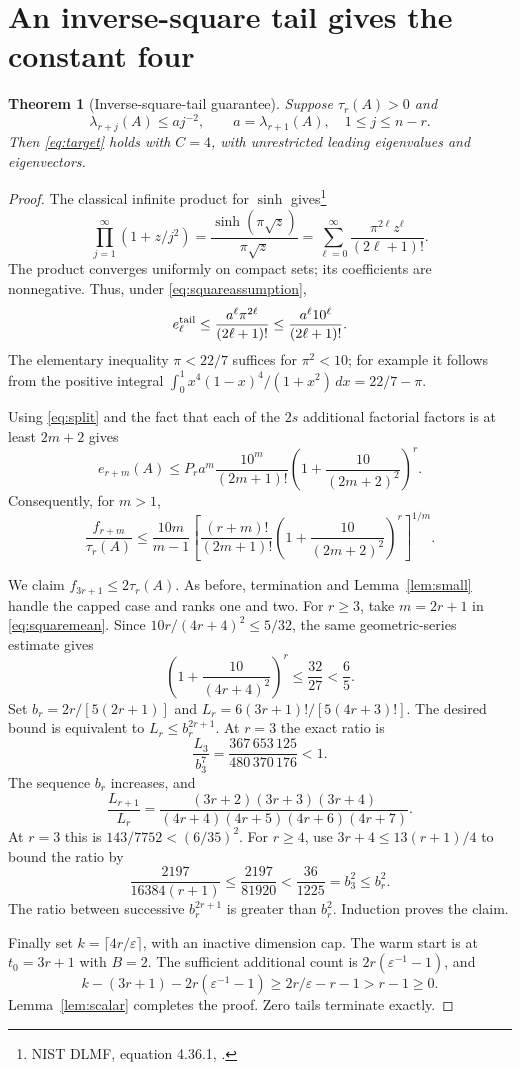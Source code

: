 \documentclass[11pt]{article}
\newtheorem{theorem}{Theorem}[section]
\theoremstyle{remark}\newtheorem{remark}[theorem]{Remark}
\newcommand{\eps}{\varepsilon}
\begin{document}
\section{An inverse-square tail gives the constant four}
\begin{theorem}[Inverse-square-tail guarantee]\label{thm:square}
Suppose $\tau_r(A)>0$ and
\begin{equation}
 \lambda_{r+j}(A)\le a j^{-2},\qquad
 a=\lambda_{r+1}(A),\quad1\le j\le n-r. \label{eq:squareassumption}
\end{equation}
Then \eqref{eq:target} holds with $C=4$, with unrestricted leading eigenvalues and eigenvectors.
\end{theorem}
\begin{proof}
The classical infinite product for $\sinh$ gives\footnote{NIST DLMF, equation 4.36.1, \cite{dlmf}.}
\[
 \prod_{j=1}^\infty(1+z/j^2)
 =\frac{\sinh(\pi\sqrt z)}{\pi\sqrt z}
 =\sum_{\ell=0}^\infty\frac{\pi^{2\ell}z^\ell}{(2\ell+1)!}.
\]
The product converges uniformly on compact sets; its coefficients are nonnegative. Thus, under \eqref{eq:squareassumption},
\[
 e_\ell^{\rm tail}\le\frac{a^\ell\pi^{2\ell}}{(2\ell+1)!}
 \le\frac{a^\ell10^\ell}{(2\ell+1)!}.
\]
The elementary inequality $\pi<22/7$ suffices for $\pi^2<10$; for example it follows from the positive integral
$\int_0^1 x^4(1-x)^4/(1+x^2)\,dx=22/7-\pi$.

Using \eqref{eq:split} and the fact that each of the $2s$ additional factorial factors is at least $2m+2$ gives
\[
 e_{r+m}(A)\le P_r a^m\frac{10^m}{(2m+1)!}
 \left(1+\frac{10}{(2m+2)^2}\right)^r.
\]
Consequently, for $m>1$,
\begin{equation}
 \frac{f_{r+m}}{\tau_r(A)}\le
 \frac{10m}{m-1}
 \left[\frac{(r+m)!}{(2m+1)!}
 \left(1+\frac{10}{(2m+2)^2}\right)^r\right]^{1/m}. \label{eq:squaremean}
\end{equation}

We claim $f_{3r+1}\le2\tau_r(A)$. As before, termination and Lemma~\ref{lem:small} handle the capped case and ranks one and two. For $r\ge3$, take $m=2r+1$ in \eqref{eq:squaremean}. Since $10r/(4r+4)^2\le5/32$, the same geometric-series estimate gives
\[
 \left(1+\frac{10}{(4r+4)^2}\right)^r\le\frac{32}{27}<\frac65.
\]
Set $b_r=2r/[5(2r+1)]$ and $L_r=6(3r+1)!/[5(4r+3)!]$. The desired bound is equivalent to $L_r\le b_r^{2r+1}$. At $r=3$ the exact ratio is
\[
 \frac{L_3}{b_3^7}=\frac{367\,653\,125}{480\,370\,176}<1.
\]
The sequence $b_r$ increases, and
\[
 \frac{L_{r+1}}{L_r}
 =\frac{(3r+2)(3r+3)(3r+4)}{(4r+4)(4r+5)(4r+6)(4r+7)}.
\]
At $r=3$ this is $143/7752<(6/35)^2$. For $r\ge4$, use $3r+4\le13(r+1)/4$ to bound the ratio by
\[
 \frac{2197}{16384(r+1)}\le\frac{2197}{81920}
 <\frac{36}{1225}=b_3^2\le b_r^2.
\]
The ratio between successive $b_r^{2r+1}$ is greater than $b_r^2$. Induction proves the claim.

Finally set $k=\lceil4r/\eps\rceil$, with an inactive dimension cap. The warm start is at $t_0=3r+1$ with $B=2$. The sufficient additional count is $2r(\eps^{-1}-1)$, and
\[
 k-(3r+1)-2r(\eps^{-1}-1)
 \ge 2r/\eps-r-1>r-1\ge0.
\]
Lemma~\ref{lem:scalar} completes the proof. Zero tails terminate exactly.
\end{proof}
\end{document}
